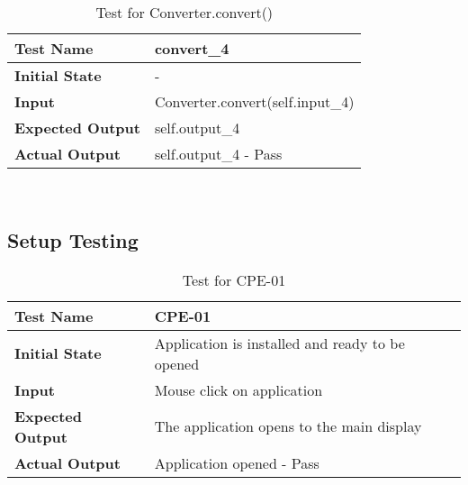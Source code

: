 \documentclass[12pt, titlepage]{article}
\begin{document}
            \hfill	%
	    \begin{table}[!htbp]
			\begin{tabularx}{\textwidth}{|l|X|}%
				\hline
                \textbf{Test Name} & convert\_4 
                \\\hline
                \textbf{Initial State} & -
                \\\hline
                \textbf{Input} & Converter.convert(self.input\_4)
                \\\hline 
                \textbf{Expected Output} & self.output\_4
                \\\hline
                \textbf{Actual Output} & self.output\_4 - Pass
                \\\hline
			\end{tabularx}\\ %
			\caption{Test for Converter.convert()}
			\label{Table}
	    \end{table}
        \FloatBarrier       %

\newpage %
\subsection{Setup Testing}
	
		\begin{table}[!htbp]
			
			\begin{tabularx}{\textwidth}{|l|X|}
				\hline
				
				\textbf{Test Name} & CPE-01
				\\ 
				\hline
				\textbf{Initial State} & Application is installed and ready to be opened \\ 
				\hline
				\textbf{Input} & Mouse click on application  \\ 
				\hline 
				\textbf{Expected Output} & The application opens to the main display \\ 	
				\hline
				\textbf{Actual Output} & Application opened - Pass \\
				\hline

			\end{tabularx}
			\caption{Test for CPE-01}
			\label{Table}
		\end{table}
		
\end{document}
